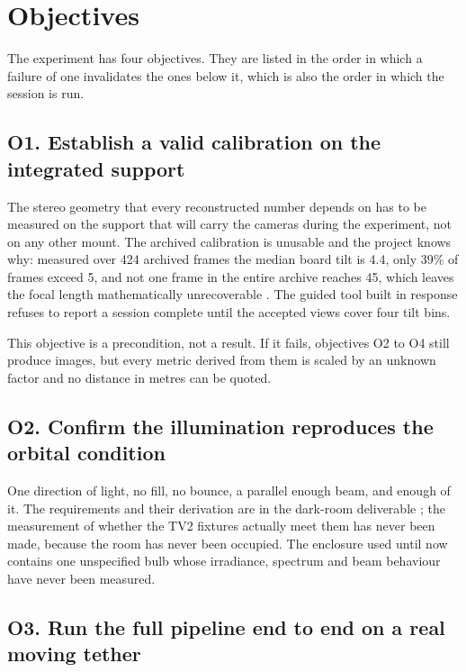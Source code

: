 \chapter{Objectives}
\label{chap:objectives}

The experiment has four objectives. They are listed in the order in which a
failure of one invalidates the ones below it, which is also the order in which
the session is run.

\section{O1. Establish a valid calibration on the integrated support}

The stereo geometry that every reconstructed number depends on has to be
measured on the support that will carry the cameras during the experiment, not
on any other mount. The archived calibration is unusable and the project knows
why: measured over 424 archived frames the median board tilt is
4.4\textdegree, only 39\% of frames exceed 5\textdegree, and not one frame in
the entire archive reaches 45\textdegree, which leaves the focal length
mathematically unrecoverable \cite{linku_calibration_method}. The guided tool
built in response refuses to report a session complete until the accepted
views cover four tilt bins.

This objective is a precondition, not a result. If it fails, objectives O2 to
O4 still produce images, but every metric derived from them is scaled by an
unknown factor and no distance in metres can be quoted.

\section{O2. Confirm the illumination reproduces the orbital condition}

One direction of light, no fill, no bounce, a parallel enough beam, and enough
of it. The requirements and their derivation are in the dark-room deliverable
\cite{linku_darkroom_illumination}; the measurement of whether the TV2 fixtures
actually meet them has never been made, because the room has never been
occupied. The enclosure used until now contains one unspecified bulb whose
irradiance, spectrum and beam behaviour have never been measured.

\section{O3. Run the full pipeline end to end on a real moving tether}

